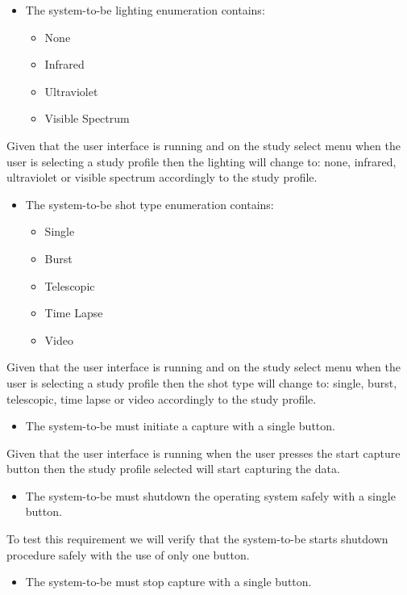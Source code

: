 \begin{itemize}
    \item The system-to-be lighting enumeration contains:
    \begin{itemize}
        \item None
        \item Infrared
        \item Ultraviolet
        \item Visible Spectrum
    \end{itemize}
\end{itemize}
Given that the user interface is running and on the study select menu when the user is selecting a study profile then the lighting will change to: none, infrared, ultraviolet or visible spectrum accordingly to the study profile.
\begin{itemize}
    \item The system-to-be shot type enumeration contains:
	      \begin{itemize}
		      \item Single
		      \item Burst
		      \item Telescopic
		      \item Time Lapse
		      \item Video
	      \end{itemize}
\end{itemize}
Given that the user interface is running and on the study select menu when the user is selecting a study profile then the shot type will change to: single, burst, telescopic, time lapse or video accordingly to the study profile.
\begin{itemize}
    \item The system-to-be must initiate a capture with a single button.
\end{itemize}
Given that the user interface is running when the user presses the start capture button then the study profile selected will start capturing the data. 
\begin{itemize}
    \item The system-to-be must shutdown the operating system safely with a single button.
\end{itemize}
To test this requirement we will verify that the system-to-be starts shutdown procedure safely with the use of only one button.
\begin{itemize}
    \item The system-to-be must stop capture with a single button.
\end{itemize}
